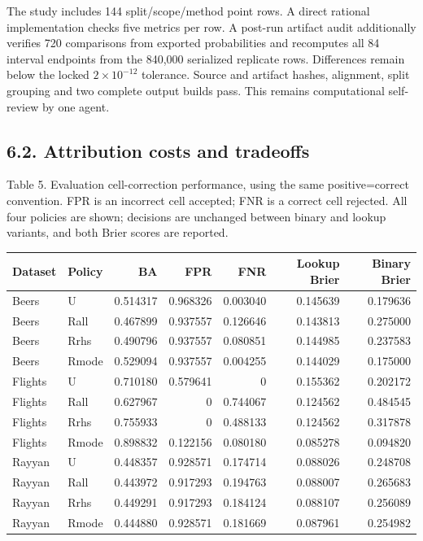The study includes 144 split/scope/method point rows. A direct rational
implementation checks five metrics per row. A post-run artifact audit
additionally verifies 720 comparisons from exported probabilities and
recomputes all 84 interval endpoints from the 840,000 serialized
replicate rows. Differences remain below the locked \(2\times10^{-12}\)
tolerance. Source and artifact hashes, alignment, split grouping and two
complete output builds pass. This remains computational self-review by
one agent.

\hypertarget{attribution-costs-and-tradeoffs}{%
\subsection{6.2. Attribution costs and
tradeoffs}\label{attribution-costs-and-tradeoffs}}

\noindent\begin{minipage}{\linewidth}
\noindent Table 5. Evaluation cell-correction performance, using the same
positive=correct convention. FPR is an incorrect cell accepted; FNR is a
correct cell rejected. All four policies are shown; decisions are
unchanged between binary and lookup variants, and both Brier scores are
reported.
\par\medskip\centering
\begin{tabular}{@{}llrrrrr@{}}
\toprule
Dataset & Policy & BA & FPR & FNR & Lookup Brier & Binary Brier \\
\midrule

Beers & U & 0.514317 & 0.968326 & 0.003040 & 0.145639 & 0.179636 \\
Beers & Rall & 0.467899 & 0.937557 & 0.126646 & 0.143813 & 0.275000 \\
Beers & Rrhs & 0.490796 & 0.937557 & 0.080851 & 0.144985 & 0.237583 \\
Beers & Rmode & 0.529094 & 0.937557 & 0.004255 & 0.144029 & 0.175000 \\
Flights & U & 0.710180 & 0.579641 & 0 & 0.155362 & 0.202172 \\
Flights & Rall & 0.627967 & 0 & 0.744067 & 0.124562 & 0.484545 \\
Flights & Rrhs & 0.755933 & 0 & 0.488133 & 0.124562 & 0.317878 \\
Flights & Rmode & 0.898832 & 0.122156 & 0.080180 & 0.085278 &
0.094820 \\
Rayyan & U & 0.448357 & 0.928571 & 0.174714 & 0.088026 & 0.248708 \\
Rayyan & Rall & 0.443972 & 0.917293 & 0.194763 & 0.088007 & 0.265683 \\
Rayyan & Rrhs & 0.449291 & 0.917293 & 0.184124 & 0.088107 & 0.256089 \\
Rayyan & Rmode & 0.444880 & 0.928571 & 0.181669 & 0.087961 & 0.254982 \\
\bottomrule
\end{tabular}
\end{minipage}


